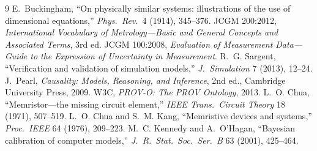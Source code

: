 \documentclass[11pt]{amsart}
\theoremstyle{definition}
\theoremstyle{remark}
\begin{document}
\begin{thebibliography}{9}
 E.~Buckingham, ``On physically similar systems: illustrations of the use of dimensional equations,'' \emph{Phys.\ Rev.}\ 4 (1914), 345--376.
 JCGM 200:2012, \emph{International Vocabulary of Metrology---Basic and General Concepts and Associated Terms}, 3rd ed.
 JCGM 100:2008, \emph{Evaluation of Measurement Data---Guide to the Expression of Uncertainty in Measurement}.
 R.~G. Sargent, ``Verification and validation of simulation models,'' \emph{J.\ Simulation} 7 (2013), 12--24.
 J.~Pearl, \emph{Causality: Models, Reasoning, and Inference}, 2nd ed., Cambridge University Press, 2009.
 W3C, \emph{PROV-O: The PROV Ontology}, 2013.
 L.~O. Chua, ``Memristor---the missing circuit element,'' \emph{IEEE Trans.\ Circuit Theory} 18 (1971), 507--519.
 L.~O. Chua and S.~M. Kang, ``Memristive devices and systems,'' \emph{Proc.\ IEEE} 64 (1976), 209--223.
 M.~C. Kennedy and A.~O'Hagan, ``Bayesian calibration of computer models,'' \emph{J.\ R.\ Stat.\ Soc.\ Ser.~B} 63 (2001), 425--464.
\end{thebibliography}
\end{document}
